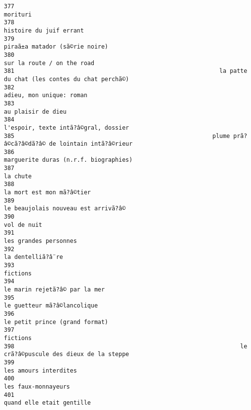 \documentclass[
]{report}
\begin{document}
\begin{verbatim}
377                                                                                                morituri
378                                                                                 histoire du juif errant
379                                                                          piraã±a matador (sã©rie noire)
380                                                                              sur la route / on the road
381                                                           la patte du chat (les contes du chat perchã©)
382                                                                                adieu, mon unique: roman
383                                                                                      au plaisir de dieu
384                                                                    l'espoir, texte intã?â©gral, dossier
385                                                         plume prã?â©cã?â©dã?â© de lointain intã?â©rieur
386                                                                   marguerite duras (n.r.f. biographies)
387                                                                                                la chute
388                                                                               la mort est mon mã?â©tier
389                                                                     le beaujolais nouveau est arrivã?â©
390                                                                                             vol de nuit
391                                                                                   les grandes personnes
392                                                                                       la dentelliã?â¨re
393                                                                                                fictions
394                                                                           le marin rejetã?â© par la mer
395                                                                             le guetteur mã?â©lancolique
396                                                                          le petit prince (grand format)
397                                                                                                fictions
398                                                                 le crã?â©puscule des dieux de la steppe
399                                                                                   les amours interdites
400                                                                                     les faux-monnayeurs
401                                                                               quand elle etait gentille

\end{verbatim}
\end{document}
